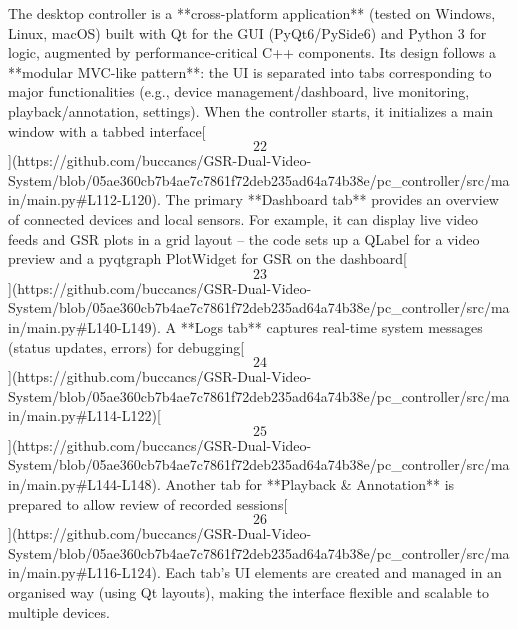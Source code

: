 \documentclass[12pt,a4paper]{article}
\begin{document}
{The desktop controller is a **cross-platform application** (tested on
Windows, Linux, macOS) built with Qt for the GUI (PyQt6/PySide6) and
Python 3 for logic, augmented by performance-critical C++ components.
Its design follows a **modular MVC-like pattern**: the UI is separated
into tabs corresponding to major functionalities (e.g., device
management/dashboard, live monitoring, playback/annotation, settings).
When the controller starts, it initializes a main window with a tabbed
interface[\[22\]](https://github.com/buccancs/GSR-Dual-Video-System/blob/05ae360cb7b4ae7c7861f72deb235ad64a74b38e/pc_controller/src/main/main.py#L112-L120).
The primary **Dashboard tab** provides an overview of connected devices
and local sensors. For example, it can display live video feeds and GSR
plots in a grid layout -- the code sets up a QLabel for a video preview
and a pyqtgraph PlotWidget for GSR on the
dashboard[\[23\]](https://github.com/buccancs/GSR-Dual-Video-System/blob/05ae360cb7b4ae7c7861f72deb235ad64a74b38e/pc_controller/src/main/main.py#L140-L149).
A **Logs tab** captures real-time system messages (status updates,
errors) for
debugging[\[24\]](https://github.com/buccancs/GSR-Dual-Video-System/blob/05ae360cb7b4ae7c7861f72deb235ad64a74b38e/pc_controller/src/main/main.py#L114-L122)[\[25\]](https://github.com/buccancs/GSR-Dual-Video-System/blob/05ae360cb7b4ae7c7861f72deb235ad64a74b38e/pc_controller/src/main/main.py#L144-L148).
Another tab for **Playback & Annotation** is prepared to allow review of
recorded
sessions[\[26\]](https://github.com/buccancs/GSR-Dual-Video-System/blob/05ae360cb7b4ae7c7861f72deb235ad64a74b38e/pc_controller/src/main/main.py#L116-L124).
Each tab's UI elements are created and managed in an organised way
(using Qt layouts), making the interface flexible and scalable to
multiple devices.

}
\end{document}
